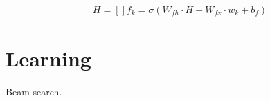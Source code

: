 \begin{equation}
\begin{gathered}
    H = []
    f_k = \sigma(W_{fh}\cdot H + W_{fx} \cdot w_k + b_f)

\end{gathered}
\label{eq:tree_lstm2}
\end{equation}

% 

\section{Learning}
Beam search.